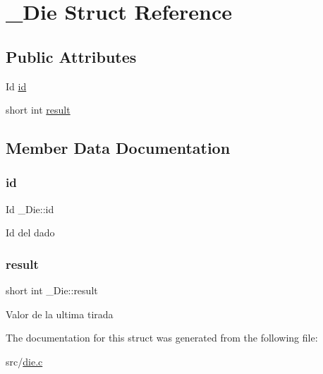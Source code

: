 \hypertarget{struct__Die}{}\section{\+\_\+\+Die Struct Reference}
\label{struct__Die}
\subsection*{Public Attributes}
\begin{DoxyCompactItemize}
\item 
Id \hyperlink{struct__Die_a0887af562dda760409957f13619d36f1}{id}
\item 
short int \hyperlink{struct__Die_a93f9aa650af74c81ab2377ceb7324250}{result}
\end{DoxyCompactItemize}


\subsection{Member Data Documentation}
\mbox{\label{struct__Die_a0887af562dda760409957f13619d36f1}} 
\subsubsection{\texorpdfstring{id}{id}}
{\footnotesize\ttfamily Id \+\_\+\+Die\+::id}

Id del dado \mbox{\label{struct__Die_a93f9aa650af74c81ab2377ceb7324250}} 
\subsubsection{\texorpdfstring{result}{result}}
{\footnotesize\ttfamily short int \+\_\+\+Die\+::result}

Valor de la ultima tirada 

The documentation for this struct was generated from the following file\+:\begin{DoxyCompactItemize}
\item 
src/\hyperlink{die_8c}{die.\+c}\end{DoxyCompactItemize}
